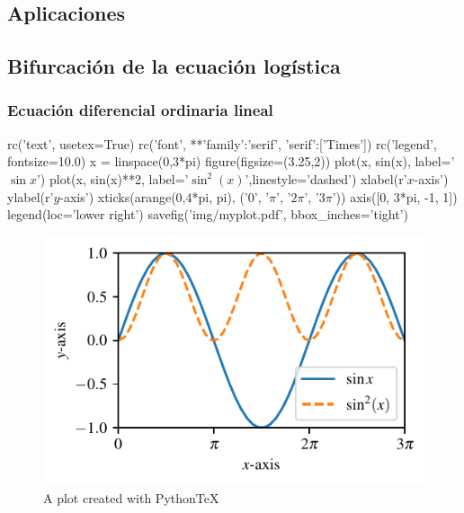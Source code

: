 \begin{partbacktext}
\part{Aplicaciones}

\end{partbacktext}
\chapter{Bifurcación de la ecuación logística}
\section{Ecuación diferencial ordinaria lineal}

\begin{pylabcode}[plotsession]
rc('text', usetex=True)
rc('font', **{'family':'serif', 'serif':['Times']})
rc('legend', fontsize=10.0)
x = linspace(0,3*pi)
figure(figsize=(3.25,2))
plot(x, sin(x), label='$\sin x$')
plot(x, sin(x)**2, label='$\sin^{2}(x)$',linestyle='dashed')
xlabel(r'$x$-axis')
ylabel(r'$y$-axis')
xticks(arange(0,4*pi, pi), ('$0$', '$\pi$', '$2\pi$', '$3\pi$'))
axis([0, 3*pi, -1, 1])
legend(loc='lower right')
savefig('img/myplot.pdf', bbox_inches='tight')
\end{pylabcode}

\begin{figure}
	\centering
	\includegraphics{./img/myplot}
	\caption{\label{fig:matlpotlib} A plot created with PythonTeX}
\end{figure}
